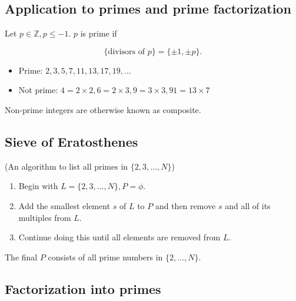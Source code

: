 \documentclass[11pt]{article}
\begin{document}
\subsection{Application to primes and prime factorization}

\begin{definition} Let \(p \in \mathbb{Z}, p \leq -1\). \(p\) is prime if

    \[
        \{ \text{divisors of } p \} = \{ \pm 1, \pm p \}.
    \]
\end{definition}
\begin{example}

    \begin{itemize}
        \item Prime: \(2, 3, 5, 7, 11, 13, 17, 19, \ldots\)
        \item Not prime: \(4 = 2 \times 2, 6 = 2 \times 3, 9 = 3 \times 3, 91 = 13 \times 7\)
    \end{itemize}
\end{example}
\begin{fact} Non-prime integers are otherwise known as composite.
\end{fact}
\subsection{Sieve of Eratosthenes}

(An algorithm to list all primes in \(\{2, 3, \ldots, N\}\))

\begin{enumerate}
    \item Begin with \(L = \{2, 3, \ldots, N\}, P = \phi\).
    \item Add the smallest element \(s\) of \(L\) to \(P\) and then remove \(s\) and all
          of its multiples from \(L\).
    \item Continue doing this until all elements are removed from \(L\).
\end{enumerate}

\begin{problem} The final \(P\) consists of all prime numbers in \(\{2, \ldots, N\}\). \end{problem}

\subsection{Factorization into primes}
\end{document}
